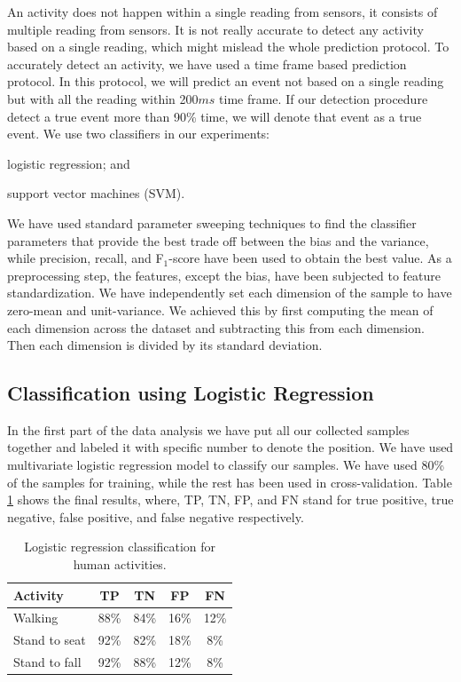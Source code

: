 \documentclass[letterpaper]{article}
\begin{document}
An activity does not happen within a single reading from sensors, it consists of multiple
reading from sensors.  It is not really accurate to detect any activity based 
on a single reading, which might mislead the whole prediction protocol. To accurately detect an 
activity, we have used a time frame based prediction protocol. In this protocol, we will predict 
an event not based on a single reading but with all the reading within 200$ms$ time frame. If our 
detection procedure detect a true  event more than 90\% time, we will denote that event as a true 
event. We use two classifiers in our experiments: \begin{inparaenum}[1)] \item logistic regression; 
and \item support vector machines (SVM)\cite{Bishop:2006:PRM:1162264}. \end{inparaenum} We have used 
standard parameter sweeping techniques to find the classifier parameters that provide 
the best trade off between the bias and the variance, while precision, recall, and F$_1$-score have 
been used to obtain the best value. As a preprocessing step, the features, except the bias, have 
been subjected to feature standardization. We have independently set each dimension of the sample 
to have zero-mean and unit-variance. We achieved this by first computing the mean of each dimension 
across the dataset and subtracting this from each dimension. Then each dimension is divided by its 
standard deviation.

\subsection{Classification using Logistic Regression}

In the first part of the data analysis we have put all our collected samples together and labeled it
with specific number to denote the position. We have used multivariate logistic regression model to
classify our samples. We have used 80\% of the samples for training, while the rest has been used
in cross-validation. Table \ref{tab:human-logistic-class} shows the final results, where, TP, TN, 
FP, and FN stand for true positive, true negative, false positive, and false negative respectively. 


\begin{table}[!ht]
\caption{Logistic regression classification for human activities.}
	\label{tab:human-logistic-class}
	\centering
		\begin{tabular} {|l |c |c |c|c|}
			\hline
			{\bf Activity} & {\bf  TP}  &	{\bf TN}  &	{\bf FP} &	{\bf FN} \\ 
			\hline
			Walking	& 88\%	& 84\%	& 16\%	& 12\% \\ \hline
			Stand to seat	& 92\%	& 82\%	& 18\% & 	8\%	 \\ \hline 
			Stand to fall	& 92\%	& 88\%	& 12\%	& 8\%	 \\ \hline
		\end{tabular}
\end{table}
\end{document}
